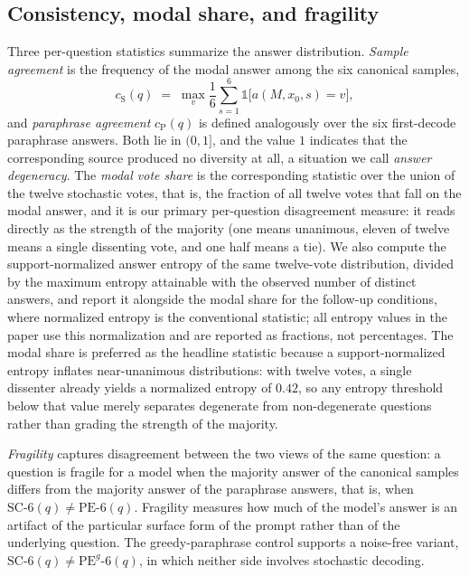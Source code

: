 \subsection{Consistency, modal share, and fragility}

Three per-question statistics summarize the answer distribution. \emph{Sample agreement} is the frequency of the modal answer among the six canonical samples,
\begin{equation}
c_{\mathrm{S}}(q) \;=\; \max_{v} \frac{1}{6} \sum_{s=1}^{6} \mathbb{1}\bigl[ a(M, x_0, s) = v \bigr],
\end{equation}
and \emph{paraphrase agreement} $c_{\mathrm{P}}(q)$ is defined analogously over the six first-decode paraphrase answers. Both lie in $(0, 1]$, and the value $1$ indicates that the corresponding source produced no diversity at all, a situation we call \emph{answer degeneracy}. The \emph{modal vote share} is the corresponding statistic over the union of the twelve stochastic votes, that is, the fraction of all twelve votes that fall on the modal answer, and it is our primary per-question disagreement measure: it reads directly as the strength of the majority (one means unanimous, eleven of twelve means a single dissenting vote, and one half means a tie). We also compute the support-normalized answer entropy of the same twelve-vote distribution, divided by the maximum entropy attainable with the observed number of distinct answers, and report it alongside the modal share for the follow-up conditions, where normalized entropy is the conventional statistic; all entropy values in the paper use this normalization and are reported as fractions, not percentages. The modal share is preferred as the headline statistic because a support-normalized entropy inflates near-unanimous distributions: with twelve votes, a single dissenter already yields a normalized entropy of $0.42$, so any entropy threshold below that value merely separates degenerate from non-degenerate questions rather than grading the strength of the majority.

\emph{Fragility} captures disagreement between the two views of the same question: a question is fragile for a model when the majority answer of the canonical samples differs from the majority answer of the paraphrase answers, that is, when $\mathrm{SC}\text{-}6(q) \ne \mathrm{PE}\text{-}6(q)$. Fragility measures how much of the model's answer is an artifact of the particular surface form of the prompt rather than of the underlying question. The greedy-paraphrase control supports a noise-free variant, $\mathrm{SC}\text{-}6(q) \ne \mathrm{PE}^{g}\text{-}6(q)$, in which neither side involves stochastic decoding.

